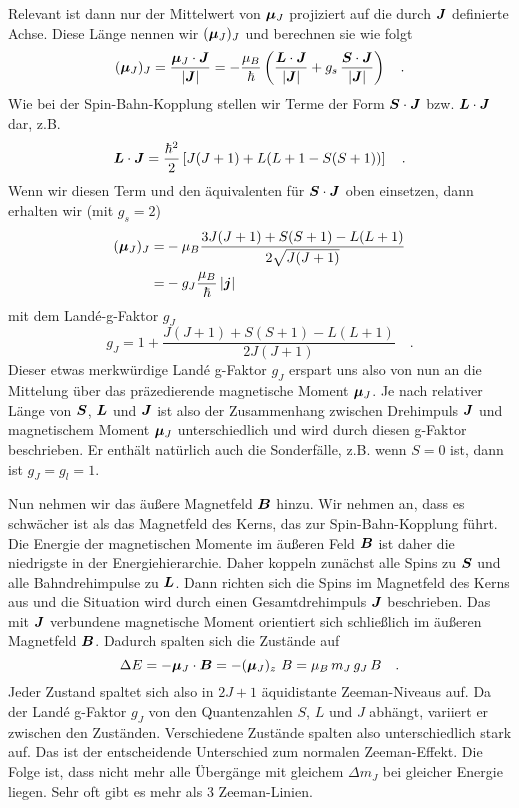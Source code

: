 Relevant ist dann nur der Mittelwert von  $\boldsymbol{\mu}_J $ projiziert auf die durch $\boldsymbol{J}$ definierte Achse.  Diese Länge nennen wir $(\boldsymbol{\mu}_J)_J$ und berechnen sie wie folgt
\begin{equation}
    (\boldsymbol{\mu}_J)_J = \frac{\boldsymbol{\mu}_J \cdot \boldsymbol{J}}{|\boldsymbol{J}|}
    = - \frac{\mu_B}{\hbar} \left(
        \frac{\boldsymbol{L} \cdot \boldsymbol{J}}{|\boldsymbol{J}|}
        +  g_s \,\frac{\boldsymbol{S} \cdot \boldsymbol{J}}{|\boldsymbol{J}|}
    \right)  \quad .
\end{equation}
Wie bei der Spin-Bahn-Kopplung stellen wir Terme der Form $\boldsymbol{S} \cdot \boldsymbol{J}$ bzw. $\boldsymbol{L} \cdot \boldsymbol{J}$  dar, z.B.
\begin{equation}
    \boldsymbol{L} \cdot \boldsymbol{J} = \frac{\hbar^2}{2}
    \left[
  J (J+1) + L(L+1 - S(S+1))
    \right]  \quad .
\end{equation}
Wenn wir diesen Term und den äquivalenten für  $\boldsymbol{S} \cdot \boldsymbol{J}$  oben einsetzen, dann erhalten wir (mit $g_s = 2$)
\begin{align}
    (\boldsymbol{\mu}_J)_J = & - \mu_B \frac{3 J (J+1)+ S(S+1) - L(L+1)}{2 \sqrt{J (J+1)}} \\
    = & - g_J \frac{\mu_B}{\hbar} \, |\boldsymbol{j}|
\end{align}
mit dem Landé-g-Faktor $g_J$ 
\begin{equation}
    g_J = 1 + \frac{J (J+1)+ S(S+1) - L(L+1)}{2 J (J+1)}   \quad .
\end{equation}
Dieser etwas merkwürdige Landé g-Faktor $g_J$ erspart uns also von nun an die Mittelung über das präzedierende magnetische Moment $\boldsymbol{\mu}_J$. Je nach relativer Länge von $\boldsymbol{S}$, $\boldsymbol{L}$ und $\boldsymbol{J}$ ist also der Zusammenhang zwischen Drehimpuls $\boldsymbol{J}$ und magnetischem Moment $\boldsymbol{\mu}_J$ unterschiedlich und wird durch diesen g-Faktor beschrieben. Er enthält natürlich auch die Sonderfälle, z.B. wenn $S=0$ ist, dann ist $g_J = g_l = 1$.





Nun nehmen wir das äußere Magnetfeld $\boldsymbol{B}$ hinzu. Wir nehmen an, dass es schwächer ist als das Magnetfeld des Kerns, das zur Spin-Bahn-Kopplung führt. Die Energie der magnetischen Momente im äußeren Feld $\boldsymbol{B}$ ist daher die niedrigste in der Energiehierarchie. Daher koppeln zunächst alle Spins zu $\boldsymbol{S}$ und alle Bahndrehimpulse zu $\boldsymbol{L}$. Dann richten sich die Spins im Magnetfeld des Kerns aus und die Situation wird durch einen Gesamtdrehimpuls $\boldsymbol{J}$ beschrieben. Das mit $\boldsymbol{J}$ verbundene magnetische Moment orientiert sich schließlich im äußeren Magnetfeld $\boldsymbol{B}$. Dadurch spalten sich die Zustände  auf
\begin{equation}
    \Delta E = - \boldsymbol{\mu}_J \cdot \boldsymbol{B} =-  (\boldsymbol{\mu}_J)_z  \, \, B =  \mu_B \, m_J \, g_J \, B  \quad .
\end{equation}
Jeder Zustand spaltet sich also in $2J+1$ äquidistante Zeeman-Niveaus auf. Da der Landé g-Faktor $g_J$ von den Quantenzahlen $S$, $L$ und $J$ abhängt, variiert er zwischen den Zuständen. Verschiedene Zustände spalten also unterschiedlich stark auf. Das ist der entscheidende Unterschied zum normalen Zeeman-Effekt. Die Folge ist, dass nicht mehr alle Übergänge mit gleichem $\Delta m_J$ bei gleicher Energie liegen. Sehr oft gibt es mehr als 3 Zeeman-Linien. 

